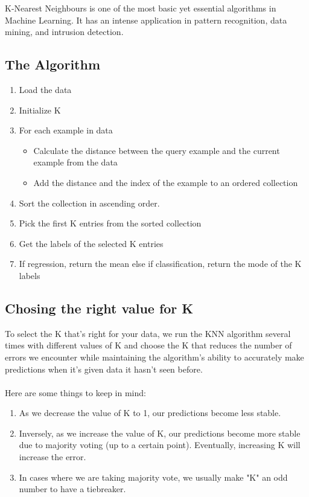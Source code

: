 K-Nearest Neighbours is one of the most basic yet essential algorithms in Machine Learning. It has an intense application in pattern recognition, data mining, and intrusion detection.

\subsection{The Algorithm}
    \begin{enumerate}
        \item Load the data
        \item Initialize K
        \item For each example in data
        \begin{itemize}
            \item Calculate the distance between the query example and the current example from the data
            \item Add the distance and the index of the example to an ordered collection
        \end{itemize}
        \item Sort the collection in ascending order.
        \item Pick the first K entries from the sorted collection
        \item Get the labels of the selected K entries
        \item If regression, return the mean else if classification, return the mode of the K labels
    \end{enumerate}

\subsection{Chosing the right value for K}
    To select the K that’s right for your data, we run the KNN algorithm several times with different values of K and choose the K that reduces the number of errors we encounter while maintaining the algorithm’s ability to accurately make predictions when it’s given data it hasn’t seen before.\\ \\
    Here are some things to keep in mind:
    \begin{enumerate}
        \item As we decrease the value of K to 1, our predictions become less stable.
        \item Inversely, as we increase the value of K, our predictions become more stable due to majority voting (up to a certain point). Eventually, increasing K will increase the error.
        \item In cases where we are taking majority vote, we usually make "K" an odd number to have a tiebreaker. 
    \end{enumerate}

